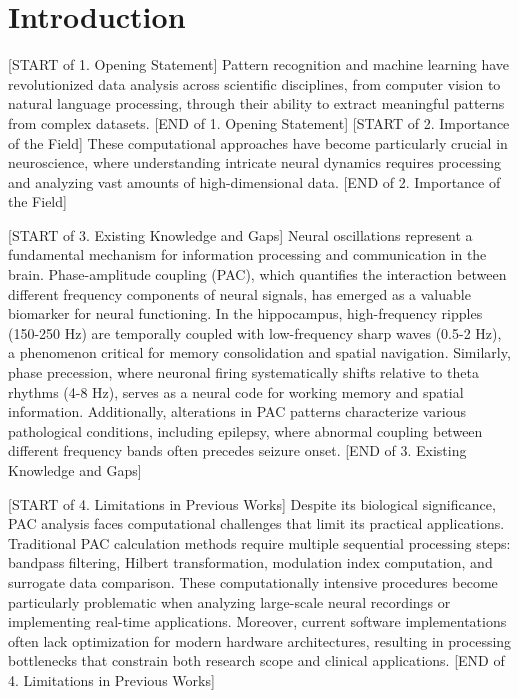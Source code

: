 
\section{Introduction}
[START of 1. Opening Statement] Pattern recognition and machine learning have revolutionized data analysis across scientific disciplines, from computer vision to natural language processing, through their ability to extract meaningful patterns from complex datasets. [END of 1. Opening Statement] [START of 2. Importance of the Field] These computational approaches have become particularly crucial in neuroscience, where understanding intricate neural dynamics requires processing and analyzing vast amounts of high-dimensional data. [END of 2. Importance of the Field]

[START of 3. Existing Knowledge and Gaps] Neural oscillations represent a fundamental mechanism for information processing and communication in the brain. Phase-amplitude coupling (PAC), which quantifies the interaction between different frequency components of neural signals, has emerged as a valuable biomarker for neural functioning. In the hippocampus, high-frequency ripples (150-250 Hz) are temporally coupled with low-frequency sharp waves (0.5-2 Hz), a phenomenon critical for memory consolidation and spatial navigation. Similarly, phase precession, where neuronal firing systematically shifts relative to theta rhythms (4-8 Hz), serves as a neural code for working memory and spatial information. Additionally, alterations in PAC patterns characterize various pathological conditions, including epilepsy, where abnormal coupling between different frequency bands often precedes seizure onset. [END of 3. Existing Knowledge and Gaps]

[START of 4. Limitations in Previous Works] Despite its biological significance, PAC analysis faces computational challenges that limit its practical applications. Traditional PAC calculation methods require multiple sequential processing steps: bandpass filtering, Hilbert transformation, modulation index computation, and surrogate data comparison. These computationally intensive procedures become particularly problematic when analyzing large-scale neural recordings or implementing real-time applications. Moreover, current software implementations often lack optimization for modern hardware architectures, resulting in processing bottlenecks that constrain both research scope and clinical applications. [END of 4. Limitations in Previous Works]

